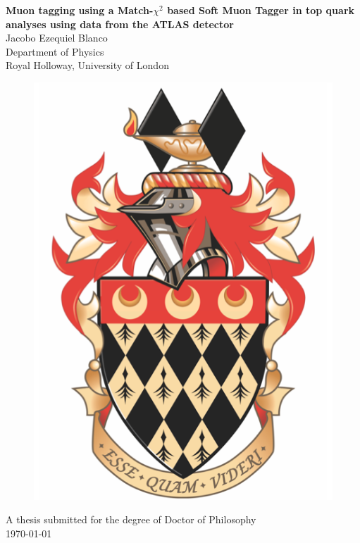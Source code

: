 \begin{titlepage}
\begin{center}
{\LARGE \textbf{Muon tagging using a Match-$\chi^{2}$ based Soft Muon Tagger in top quark analyses using data from the ATLAS detector\\}}
\vspace{1cm}
{\Large Jacobo Ezequiel Blanco\\}
\vspace{1cm}
{\large Department of Physics\\}
{\large Royal Holloway, University of London\\}

\begin{figure}[ht]
  \centering
  \includegraphics[width=0.3\linewidth]{./res/RHULCrest.png}
\end{figure}

{\Large A thesis submitted for the degree of Doctor of Philosophy\\}
\vspace{1cm}
{\today\\}
\end{center}
\end{titlepage}
